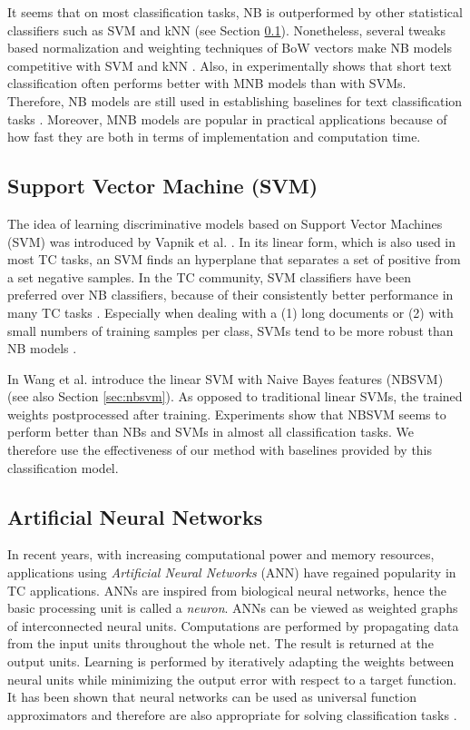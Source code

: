 It seems that on most classification tasks, NB is outperformed by other
statistical classifiers such as SVM and kNN (see Section \ref{sec:svm}). 
Nonetheless, several tweaks based normalization and
weighting techniques of BoW vectors make NB models
competitive with SVM and kNN \cite{kim2006some, Mendoza2012}. Also, in
\cite{wang2012baselines} experimentally shows that short text classification 
often performs better with MNB models than with SVMs. Therefore, NB models are
still used in establishing baselines for text classification tasks
\cite{Rennie2003}. Moreover, MNB models are popular in practical
applications because of how fast they are both in terms of implementation and
computation time.

\subsection{Support Vector Machine (SVM)}
\label{sec:svm}

The idea of learning discriminative models based on Support Vector Machines
(SVM) was introduced by Vapnik et al. \cite{vapnik2013nature}. In its linear
form, which is also used in most TC tasks, an SVM finds an
hyperplane that separates a set of positive from a set negative samples.
In the TC community, SVM classifiers have been preferred over NB classifiers, because of
their consistently better performance in many TC tasks
\cite{dumais1998inductive}. Especially when dealing with a (1) long documents
or (2) with small numbers of training samples per 
class, SVMs tend to be more robust than NB models \cite{wang2012baselines, Yang1999}.

In \cite{wang2012baselines} Wang et al. introduce the linear SVM with Naive
Bayes features (NBSVM) (see also Section \ref{sec:nbsvm}). As opposed to
traditional linear SVMs, the trained weights postprocessed after training.
Experiments show that NBSVM seems to perform better than NBs and SVMs in almost
all classification tasks. We therefore use the effectiveness of our method with 
baselines provided by this classification model.

\subsection{Artificial Neural Networks}

In recent years, with increasing computational power and memory resources, applications 
using \emph{Artificial Neural Networks} (ANN) have regained popularity in TC
applications. ANNs are inspired from biological neural networks, hence the basic
processing unit is called a \emph{neuron}. ANNs can be viewed as weighted
graphs of interconnected neural units. Computations are
performed by propagating data from the input units throughout the whole net. The result is
returned at the output units. Learning is performed by iteratively adapting the
weights between neural units while minimizing the output error with respect to a
target function. It has been shown that neural networks can be used as universal
function approximators and therefore are also appropriate for solving
classification tasks \cite{Hornik1989}. 

